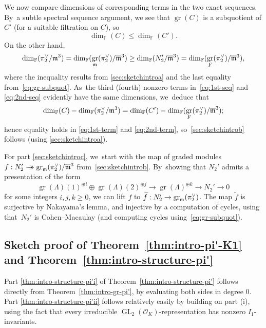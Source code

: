 \documentclass[JEP,XML,SOM,Unicode,NoFloatCountersInSection, NoEqCountersInSection,published]{cedram}
\newcommand{\onto}{\mathchoice{\to\hspace*{-5mm}\to}{\mathrel{\hbox{$\to\hspace*{-2.85mm}\to$}}}{\to\hspace*{-3mm}\to}{\to\hspace*{-3mm}\to}}
\let\wt\widetilde
\let\ovl\overline
\newcommand{\F}{\mathbb{F}}
\newcommand{\cO}{\mathcal{O}}
\DeclareMathOperator{\GL}{GL}
\DeclareMathOperator{\gr}{gr}
\theoremstyle{plain}
\theoremstyle{definition}
\begin{document}
We now compare dimensions of corresponding terms in the two exact sequences. By~a subtle spectral sequence argument, we see that $\gr(C)$ is a subquotient of $C'$ (for a suitable filtration on $C$), so\vspace*{-3pt}
\begin{equation}\label{eq:1st-term}
\dim_\F(C) \le \dim_\F(C').
\end{equation}
On the other hand,
\begin{equation}\label{eq:2nd-term}
\dim_\F(\pi_2^\vee/\m^3) = \dim_\F(\gr_\m(\pi_2^\vee)/\ovl\m^3) \ge \dim_\F(N_2'/\ovl\m^3) = \dim_\F(\gr_{F}(\pi_2^\vee)/\ovl\m^3),
\end{equation}
where the inequality results from \eqref{sec:sketchintroa} and the last equality from~\eqref{eq:gr-subquot}. As~the third (\resp fourth) nonzero terms in~\eqref{eq:1st-seq} and \eqref{eq:2nd-seq} evidently have the same dimensions, we~deduce that\vspace*{-3pt}
\[
\dim_\F(C) - \dim_\F(\pi_2^\vee/\m^3) = \dim_\F(C') - \dim_\F(\gr_{F}(\pi_2^\vee)/\ovl\m^3);
\]
hence equality holds in \eqref{eq:1st-term} and \eqref{eq:2nd-term}, so~\eqref{sec:sketchintrob} follows (using \eqref{sec:sketchintroa}).

For part \eqref{sec:sketchintroc}, we~start with the map of graded modules $f: N_2' \onto \gr_\m(\pi_2^\vee)/\ovl\m^3$ from~\eqref{sec:sketchintrob}. By~showing that $N_2'$ admits a presentation of the form\vspace*{-3pt}
\[
\gr(\Lambda)(1)^{\oplus i} \oplus \gr(\Lambda)(2)^{\oplus j} \to \gr(\Lambda)^{\oplus k} \to N_2' \to 0
\]
for some integers $i,j,k \ge 0$, we can lift $f$ to $\wt f: N_2' \to \gr_\m(\pi_2^\vee)$.
The map $\wt f$ is surjective by Nakayama's lemma, and injective by a computation of cycles, using that~$N_2'$ is Cohen--Macaulay (and computing cycles using~\eqref{eq:gr-subquot}).

\subsection{Sketch proof of Theorem~\ref{thm:intro-pi'-K1} and Theorem~\ref{thm:intro-structure-pi'}}\label{sec:sketchintro2}

Part \eqref{thm:intro-structure-pi'i} of Theorem~\ref{thm:intro-structure-pi'} follows directly from Theorem~\ref{thm:intro-gr-pi'}, by evaluating both sides in degree $0$.
Part \eqref{thm:intro-structure-pi'ii} follows relatively easily by building on part (i), using the fact that every irreducible $\GL_2(\cO_K)$-representation has nonzero $I_1$-invariants.
\end{document}
